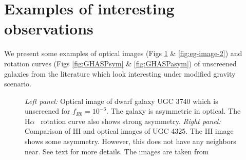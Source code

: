 \documentclass[useAMS,usenatbib,twocolumn]{mn2e}
\newcommand{\ha}{H$\alpha$}
\begin{document}
\section{Examples of interesting observations}
\label{ap:curves}
We present some examples of optical images (Figs \ref{fig:eg-image-1} \&
\ref{fig:eg-image-2}) and rotation curves (Figs \ref{fig:GHASPsym} \&
\ref{fig:GHASPasym}) of unscreened galaxies from the literature which look
interesting under modified gravity scenario. 


\begin{figure}
\caption{{\it Left panel:} Optical image of dwarf galaxy UGC 3740 which is
unscreened for $f_{R0}=10^{-6}$. The galaxy is asymmetric in optical. The \ha~
rotation curve also shows strong asymmetry. 
{\it Right panel:} Comparison of HI and optical images of UGC 4325. The HI
image shows some asymmetry. However, this does not have any neighbors near. See
text for more details. The images are taken from \citet{figgs2008,swaters2002b}
\label{fig:eg-image-1}}
\end{figure}
\end{document}
